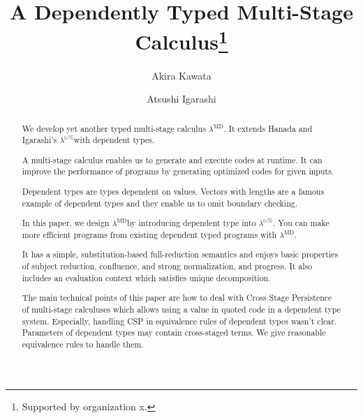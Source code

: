 \documentclass[runningheads]{llncs}
\newcommand{\LTP}{$\lambda^{\triangleright\%}$}
\newcommand{\LMD}{$\lambda^{\textrm{MD}}$}
\newcommand{\TW}{\triangleright}
\begin{document}
%
\title{A Dependently Typed Multi-Stage Calculus\thanks{Supported by organization x.}}
%
%
\author{Akira Kawata \and
Atsushi Igarashi}
%
%
%
\maketitle              %
%
\begin{abstract}


We develop yet another typed multi-stage calculus \LMD.
It extends Hanada and Igarashi's \LTP with dependent types.

A multi-stage calculus enables us to generate and execute codes at runtime.
It can improve the performance of programs by generating optimized codes for given inputs.

Dependent types are types dependent on values. 
Vectors with lengths are a famous example of dependent types and they enable us to omit boundary checking.

In this paper, we design \LMD by introducing dependent type into $\lambda^{\TW\%}$.
You can make more efficient programs from existing dependent typed programs with \LMD.

It has a simple, substitution-based full-reduction semantics and enjoys basic properties of subject reduction, confluence, and strong normalization, and progress.
It also includes an evaluation context which satisfies unique decomposition.

The main technical points of this paper are how to deal with Cross Stage Persistence of multi-stage calculuses which allows using a value in quoted code in a dependent type system.
Especially, handling CSP in equivalence rules of dependent types wasn't clear.
Parameters of dependent types may contain cross-staged terms.
We give reasonable equivalence rules to handle them.

\end{abstract}
\end{document}
